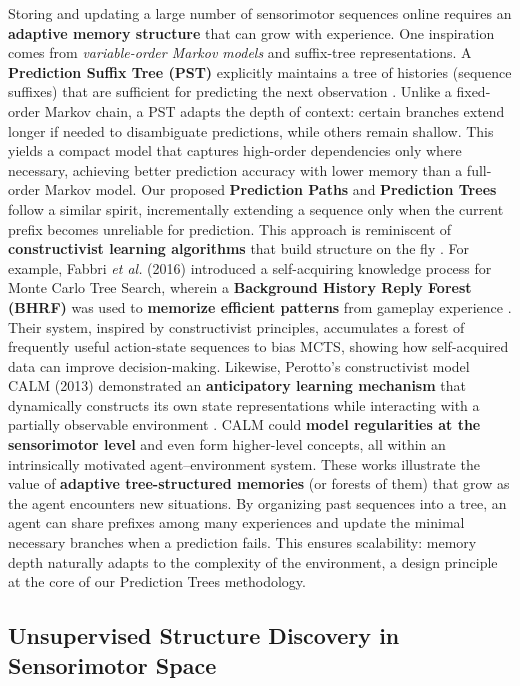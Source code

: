 \documentclass[11pt]{article}
\begin{document}
Storing and updating a large number of sensorimotor sequences online requires an \textbf{adaptive memory structure} that can grow with experience. One inspiration comes from \emph{variable-order Markov models} and suffix-tree representations. A \textbf{Prediction Suffix Tree (PST)} explicitly maintains a tree of histories (sequence suffixes) that are sufficient for predicting the next observation \cite{Ron1996}. Unlike a fixed-order Markov chain, a PST adapts the depth of context: certain branches extend longer if needed to disambiguate predictions, while others remain shallow. This yields a compact model that captures high-order dependencies only where necessary, achieving better prediction accuracy with lower memory than a full-order Markov model. Our proposed \textbf{Prediction Paths} and \textbf{Prediction Trees} follow a similar spirit, incrementally extending a sequence only when the current prefix becomes unreliable for prediction. This approach is reminiscent of \textbf{constructivist learning algorithms} that build structure on the fly \cite{Fabbri2016} \cite{Perotto2013}. For example, Fabbri \emph{et al.} (2016) introduced a self-acquiring knowledge process for Monte Carlo Tree Search, wherein a \textbf{Background History Reply Forest (BHRF)} was used to \textbf{memorize efficient patterns} from gameplay experience \cite{Fabbri2016}. Their system, inspired by constructivist principles, accumulates a forest of frequently useful action-state sequences to bias MCTS, showing how self-acquired data can improve decision-making. Likewise, Perotto’s constructivist model CALM (2013) demonstrated an \textbf{anticipatory learning mechanism} that dynamically constructs its own state representations while interacting with a partially observable environment \cite{Perotto2013}. CALM could \textbf{model regularities at the sensorimotor level} and even form higher-level concepts, all within an intrinsically motivated agent–environment system. These works illustrate the value of \textbf{adaptive tree-structured memories} (or forests of them) that grow as the agent encounters new situations. By organizing past sequences into a tree, an agent can share prefixes among many experiences and update the minimal necessary branches when a prediction fails. This ensures scalability: memory depth naturally adapts to the complexity of the environment, a design principle at the core of our Prediction Trees methodology.

\subsection{Unsupervised Structure Discovery in Sensorimotor Space}
\end{document}
